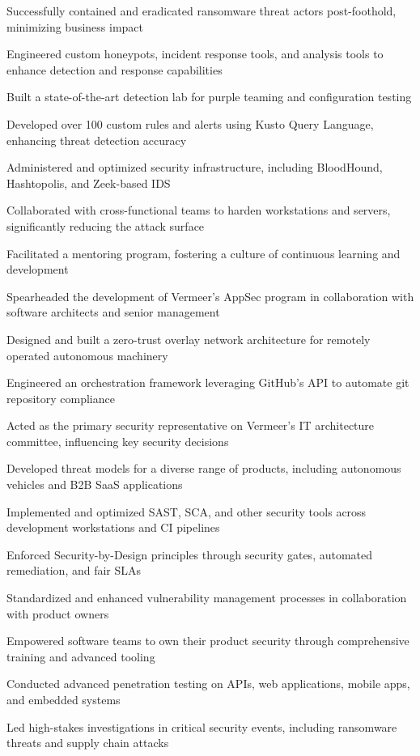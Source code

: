 \item Successfully contained and eradicated ransomware threat actors post-foothold, minimizing business impact
\item Engineered custom honeypots, incident response tools, and analysis tools to enhance detection and response capabilities
\item Built a state-of-the-art detection lab for purple teaming and configuration testing
\item Developed over 100 custom rules and alerts using Kusto Query Language, enhancing threat detection accuracy
\item Administered and optimized security infrastructure, including BloodHound, Hashtopolis, and Zeek-based IDS
\item Collaborated with cross-functional teams to harden workstations and servers, significantly reducing the attack surface
\item Facilitated a mentoring program, fostering a culture of continuous learning and development
\item Spearheaded the development of Vermeer's AppSec program in collaboration with software architects and senior management
\item Designed and built a zero-trust overlay network architecture for remotely operated autonomous machinery
\item Engineered an orchestration framework leveraging GitHub's API to automate git repository compliance
\item Acted as the primary security representative on Vermeer's IT architecture committee, influencing key security decisions
\item Developed threat models for a diverse range of products, including autonomous vehicles and B2B SaaS applications
\item Implemented and optimized SAST, SCA, and other security tools across development workstations and CI pipelines
\item Enforced Security-by-Design principles through security gates, automated remediation, and fair SLAs
\item Standardized and enhanced vulnerability management processes in collaboration with product owners
\item Empowered software teams to own their product security through comprehensive training and advanced tooling
\item Conducted advanced penetration testing on APIs, web applications, mobile apps, and embedded systems
\item Led high-stakes investigations in critical security events, including ransomware threats and supply chain attacks